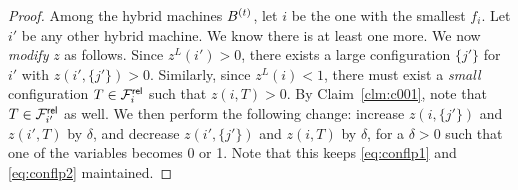 \begin{proof}
	
Among the hybrid machines $ B^{(t)}$, let $i$  be the one with the smallest $f_i$. Let $i'$ be any other hybrid machine. We know there is at least one more.
%	
%	
	We now \emph{modify} $z$ as follows.
	Since $z^L(i') > 0$, there exists a large configuration $\{j'\}$ for $i'$ with $z(i',\{j'\}) > 0$. Similarly, since $z^L(i) < 1$, there must exist a {\em small} configuration $T\in {\cal F}^{\mathsf{rel}}_i$ such that $z(i,T) > 0$.
	By Claim~\ref{clm:c001}, note that $T\in {\cal F}^{\mathsf{rel}}_{i'}$ as well.
	We then perform the following change: increase $z(i,\{j'\})$ and $z(i',T)$ by $\delta$,  and decrease $z(i',\{j'\})$ and $z(i,T)$ by $\delta$, for a $\delta > 0$ such that one of the variables becomes 0 or 1.
	Note that this keeps \eqref{eq:conflp1} and \eqref{eq:conflp2} maintained. 	%
	

\end{proof}
